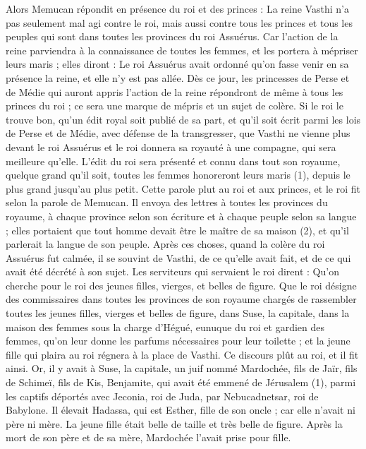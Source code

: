 \begin{multicols}{2}
Alors Memucan répondit en présence du roi et des princes : La reine Vasthi n'a pas seulement mal agi contre le roi, mais aussi contre tous les princes et tous les peuples qui sont dans toutes les provinces du roi Assuérus.
Car l'action de la reine parviendra à la connaissance de toutes les femmes, et les portera à mépriser leurs maris ; elles diront : Le roi Assuérus avait ordonné qu'on fasse venir en sa présence la reine, et elle n'y est pas allée.
Dès ce jour, les princesses de Perse et de Médie qui auront appris l’action de la reine répondront de même à tous les princes du roi ; ce sera une marque de mépris et un sujet de colère.
Si le roi le trouve bon, qu'un édit royal soit publié de sa part, et qu'il soit écrit parmi les lois de Perse et de Médie, avec défense de la transgresser, que Vasthi ne vienne plus devant le roi Assuérus et le roi donnera sa royauté à une compagne, qui sera meilleure qu'elle.
L’édit du roi sera présenté et connu dans tout son royaume, quelque grand qu'il soit, toutes les femmes honoreront leurs maris (1), depuis le plus grand jusqu'au plus petit.
Cette parole plut au roi et aux princes, et le roi fit selon la parole de Memucan.
Il envoya des lettres à toutes les provinces du royaume, à chaque province selon son écriture et à chaque peuple selon sa langue ; elles portaient que tout homme devait être le maître de sa maison (2), et qu’il parlerait la langue de son peuple.
\VerseOne{}Après ces choses, quand la colère du roi Assuérus fut calmée, il se souvint de Vasthi, de ce qu'elle avait fait, et de ce qui avait été décrété à son sujet.
Les serviteurs qui servaient le roi dirent : Qu'on cherche pour le roi des jeunes filles, vierges, et belles de figure.
Que le roi désigne des commissaires dans toutes les provinces de son royaume chargés de rassembler toutes les jeunes filles, vierges et belles de figure, dans Suse, la capitale, dans la maison des femmes sous la charge d'Hégué, eunuque du roi et gardien des femmes, qu'on leur donne les parfums nécessaires pour leur toilette ;
et la jeune fille qui plaira au roi régnera à la place de Vasthi. Ce discours plût au roi, et il fit ainsi.
Or, il y avait à Suse, la capitale, un juif nommé Mardochée, fils de Jaïr, fils de Schimeï, fils de Kis, Benjamite,
qui avait été emmené de Jérusalem (1), parmi les captifs déportés avec Jeconia, roi de Juda, par Nebucadnetsar, roi de Babylone.
Il élevait Hadassa, qui est Esther, fille de son oncle ; car elle n'avait ni père ni mère. La jeune fille était belle de taille et très belle de figure. Après la mort de son père et de sa mère, Mardochée l'avait prise pour fille.

\end{multicols}
